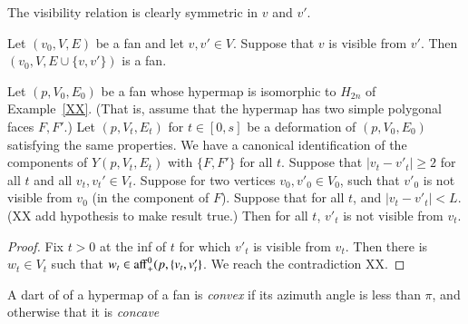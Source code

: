 The visibility relation is clearly symmetric in $v$ and $v'$.

\begin{lemma} Let $(v_0,V,E)$ be a fan and let $v,v'\in V$.
Suppose that $v$ is visible from $v'$.  Then
$(v_0,V,E\cup\{v,v'\})$ is a fan.
\end{lemma}

\begin{lemma}  Let $(p,V_0,E_0)$ be a fan whose hypermap
is isomorphic to $H_{2n}$ of Example~\ref{XX}.  (That is, assume that
the hypermap has two simple polygonal faces $F,F'$.)  Let $(p,V_t,E_t)$
for $t\in[0,s]$ be a deformation of $(p,V_0,E_0)$ satisfying the same
properties.  We have a canonical identification of the components
of $Y(p,V_t,E_t)$ with $\{F,F'\}$ for all $t$.
Suppose that $|v_t-v'_t|\ge 2$ for all $t$ and all $v_t,v_t'\in V_t$.  
Suppose for two vertices $v_0,v'_0\in V_0$, such that $v'_0$
is not visible from $v_0$ (in the component of $F$).
Suppose that for all $t$, and $|v_t-v'_t|< L$.
(XX add hypothesis to make result true.)
Then for all $t$, $v'_t$ is not visible from $v_t$.
\end{lemma}

\begin{proof} Fix $t>0$ at the inf of $t$ for which $v'_t$ is visible
from $v_t$.   Then there is $w_t\in V_t$ such that
$w_t\in {\operatorname{aff}}_+^0(p,\{v_t,v_t'\}$.  We reach the contradiction XX.
\end{proof}



\begin{definition}\label{def:concave}
A dart of of a hypermap of a fan is {\it convex\/}
if its azimuth angle is less than $\pi$, and otherwise that it
is {\it concave}
%
\end{definition}



    \label{sec:proof-2}





